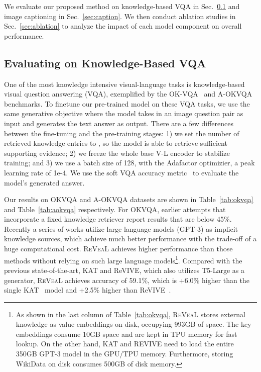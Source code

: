 \documentclass[10pt,twocolumn,letterpaper]{article}
\newcommand{\method}{R\textsc{e}V\textsc{ea}L\xspace}
\begin{document}
We evaluate our proposed method on knowledge-based VQA in Sec.~\ref{sec:vqa} and image captioning in Sec.~\ref{sec:caption}. We then conduct ablation studies in Sec.~\ref{sec:ablation} to analyze the impact of each model component on overall performance.


\subsection{Evaluating on Knowledge-Based VQA}\label{sec:vqa}
One of the most knowledge intensive visual-language tasks is knowledge-based visual question answering (VQA), exemplified by the OK-VQA~\cite{DBLP:conf/cvpr/MarinoRFM19} and A-OKVQA~\cite{DBLP:journals/corr/abs-2206-01718} benchmarks.
To finetune our pre-trained model on these VQA tasks, we use the same generative objective where the model takes in an image question pair as input and generates the text answer as output. There are a few differences between the fine-tuning and the pre-training stages: 1) we set the number of retrieved knowledge entries to , so the model is able to retrieve sufficient supporting evidence; 2) we freeze the whole base V-L encoder to stabilize training; and 3) we use a batch size of 128, with the Adafactor optimizier, a peak learning rate of 1e-4. 
We use the soft VQA accuracy metric~\cite{DBLP:journals/corr/AntolALMBZP15} to evaluate the model's generated answer.

Our results on OKVQA and A-OKVQA datasets are shown in Table~\ref{tab:okvqa} and Table~\ref{tab:aokvqa} respectively. For OKVQA, earlier attempts that incorporate a fixed knowledge retriever report results that are below 45\%.  Recently a series of works utilize large language models (\eg GPT-3) as implicit knowledge sources, which achieve much better performance with the trade-off of a huge computational cost. \method achieves higher performance than those methods without relying on such large language models\footnote{As shown in the last column of Table~\ref{tab:okvqa}, \method stores external knowledge as value embeddings on disk, occupying 993GB of space. The key embeddings consume 10GB space and are kept in TPU memory for fast lookup. On the other hand, KAT and REVIVE need to load the entire 350GB GPT-3 model in the GPU/TPU memory. Furthermore, storing WikiData on disk consumes 500GB of disk memory.}. Compared with the previous state-of-the-art, KAT and ReVIVE, which also utilizes T5-Large as a generator, \method achieves accuracy of 59.1\%, which is +6.0\% higher than the single KAT~\cite{DBLP:conf/naacl/GuiWH0BG22} model and  +2.5\% higher than ReVIVE~\cite{DBLP:journals/corr/abs-2206-01201}.
\end{document}
